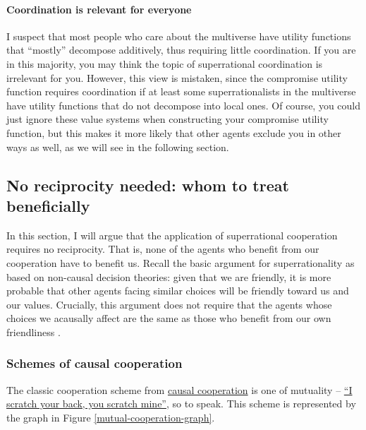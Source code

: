 \paragraph{Coordination is relevant for
everyone}\label{coordination-is-relevant-for-everyone}

I suspect that most people who care about the multiverse have utility
functions that ``mostly'' decompose additively, thus requiring little
coordination. If you are in this majority, you may think the topic of
superrational coordination is irrelevant for you. However, this view is
mistaken, since the compromise utility function requires coordination if
at least some superrationalists in the multiverse have utility functions
that do not decompose into local ones. Of course, you could just ignore
these value systems when constructing your compromise utility function,
but this makes it more likely that other agents exclude you in other
ways as well, as we will see in the following section.

\hypertarget{no-reciprocity-needed-whom-to-treat-beneficially}{\subsection{No
reciprocity needed: whom to treat
beneficially}\label{no-reciprocity-needed-whom-to-treat-beneficially}}

In this section, I will argue that the application of superrational
cooperation requires no reciprocity. That is, none of the agents who
benefit from our cooperation have to benefit us. Recall the basic
argument for superrationality as based on non-causal decision theories:
given that we are friendly, it is more probable that other agents facing
similar choices will be friendly toward us and our values. Crucially,
this argument does not require that the agents whose choices we
acausally affect are the same as those who benefit from our own
friendliness \parencite{Drescher2006-ky}.

\hypertarget{schemes-of-causal-cooperation}{\subsubsection{Schemes of
causal cooperation}\label{schemes-of-causal-cooperation}}

The classic cooperation scheme from
\href{https://en.wikipedia.org/wiki/Reciprocal_altruism}{causal
cooperation} is one of mutuality --
\href{https://en.wikipedia.org/wiki/Tit_for_tat}{``I scratch your
back, you scratch mine''}, so to speak. This scheme is represented by
the graph in Figure \ref{mutual-cooperation-graph}.

